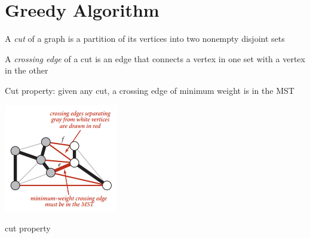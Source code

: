 \documentclass[8pt,a4paper,compress]{beamer}
\begin{document}
\section{Greedy Algorithm}
\begin{frame}
A \emph{cut} of a graph is a partition of its vertices into two nonempty disjoint sets

\bigskip

A \emph{crossing edge} of a cut is an edge that connects a vertex in one set with a vertex in the other

\bigskip

Cut property: given any cut, a crossing edge of minimum weight is in the MST

\begin{center}
\includegraphics[scale=0.4]{./figures/mst2.png}

\smallskip

\tiny cut property
\end{center}
\end{frame}
\end{document}
